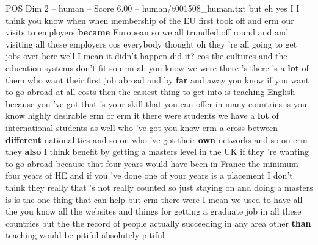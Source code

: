 \begin{textsample}{POS Dim 2 – human – Score 6.00 – human/t001508\_human.txt}  \label{ex:f2_pos_032}
but eh yes I I think you know when when membership of the EU first took off and erm our visits to employers \textbf{became} European so we all trundled off round and and visiting all these employers cos everybody thought oh they 're all going to get jobs over here well I mean it didn't happen did it? cos the cultures and the education systems don't fit so erm ah you know we were there 's there 's a \textbf{lot} of them who want their first job abroad and by \textbf{far} and away you know if you want to go abroad at all costs then the easiest thing to get into is teaching English because you 've got that 's your skill that you can offer in many countries is you know highly desirable erm or erm it there were students we have a \textbf{lot} of international students as well who 've got you know erm a cross between \textbf{different} nationalities and so on who 've got their \textbf{own} networks and so on erm they \textbf{also} I think benefit by getting a masters level in the UK if they 're wanting to go abroad because that four years would have been in France the minimum four years of HE and if you 've done one of your years is a placement I don't think they really that 's not really counted so just staying on and doing a masters is is the one thing that can help but erm there were I mean we used to have all the you know all the websites and things for getting a graduate job in all these countries but the the record of people actually succeeding in any area other \textbf{than} teaching would be pitiful absolutely pitiful

\end{textsample}

